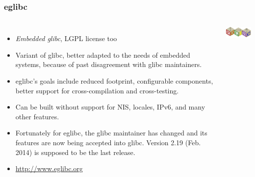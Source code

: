 \begin{frame}
  \frametitle{eglibc}
  \begin{columns}
    \begin{itemize}
    \item {\em Embedded glibc}, LGPL license too
    \item Variant of glibc, better adapted
      to the needs of embedded systems, because of past
      disagreement with glibc maintainers.
    \item eglibc's goals include reduced footprint, configurable
      components, better support for cross-compilation and
      cross-testing.
    \item Can be built without support for NIS, locales, IPv6, and many
      other features.
    \item Fortunately for eglibc, the glibc maintainer has changed
      and its features are now being accepted into glibc. Version 2.19
      (Feb. 2014) is supposed to be the last release.
    \item \url{http://www.eglibc.org}
    \end{itemize}
    \includegraphics[width=\textwidth]{slides/c-libraries/eglibc.png}
  \end{columns}
\end{frame}

